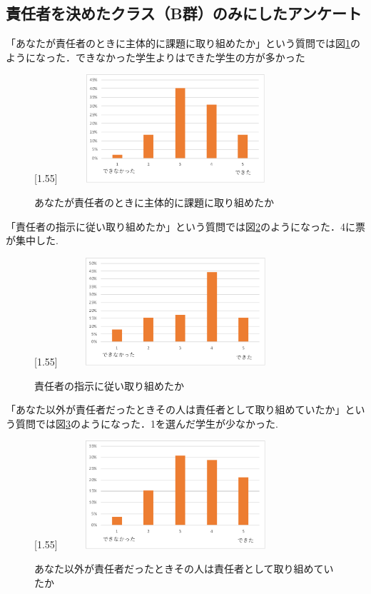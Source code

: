 \documentclass[a4j,11pt]{jsarticle}
\begin{document}
\newpage
\subsection{責任者を決めたクラス（B群）のみにしたアンケート}

「あなたが責任者のときに主体的に課題に取り組めたか」という質問では図\ref{anke14}のようになった．できなかった学生よりはできた学生の方が多かった

\begin{figure}[h]
\begin{center}
\scalebox{1.2}[1.55]{
 \includegraphics[clip,width=85mm,height=40mm]{anke14.pdf}
 }
\end{center}
 \caption{あなたが責任者のときに主体的に課題に取り組めたか}
 \label{anke14}
\end{figure}

「責任者の指示に従い取り組めたか」という質問では図\ref{anke15}のようになった．4に票が集中した.

\begin{figure}[h]
\begin{center}
\scalebox{1.2}[1.55]{
 \includegraphics[clip,width=85mm,height=40mm]{anke15.pdf}
 }
\end{center}
 \caption{責任者の指示に従い取り組めたか}
 \label{anke15}
\end{figure}


\newpage

「あなた以外が責任者だったときその人は責任者として取り組めていたか」という質問では図\ref{anke16}のようになった．1を選んだ学生が少なかった.

\begin{figure}[h]
\begin{center}
\scalebox{1.2}[1.55]{
 \includegraphics[clip,width=85mm,height=40mm]{anke16.pdf}
 }
\end{center}
 \caption{あなた以外が責任者だったときその人は責任者として取り組めていたか}
 \label{anke16}
\end{figure}
\end{document}
